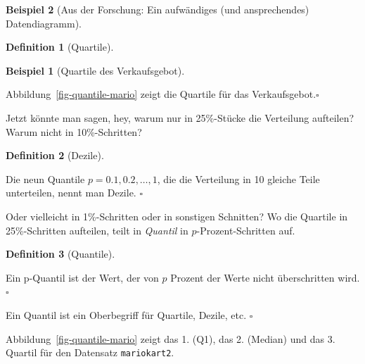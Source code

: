 \documentclass[
  a4paper,
]{scrbook}
\theoremstyle{definition}
\newtheorem{example}{Beispiel}[chapter]
\theoremstyle{definition}
\newtheorem{definition}{Definition}[chapter]
\theoremstyle{definition}
\theoremstyle{remark}
\begin{document}
\begin{example}[Aus der Forschung: Ein aufwändiges (und ansprechendes)
Datendiagramm]
\begin{definition}[Quartile]
\end{definition}

\begin{example}[Quartile des
Verkaufsgebot]\protect\hypertarget{exm-mario-qs}{}\label{exm-mario-qs}

Abbildung~\ref{fig-quantile-mario} zeigt die Quartile für das
Verkaufsgebot.\(\square\)

\end{example}

Jetzt könnte man sagen, hey, warum nur in 25\%-Stücke die Verteilung
aufteilen? Warum nicht in 10\%-Schritten?

\begin{definition}[Dezile]\protect\hypertarget{def-dezile}{}\label{def-dezile}

Die neun Quantile \(p= 0.1, 0.2, \ldots, 1\), die die Verteilung in 10
gleiche Teile unterteilen, nennt man Dezile. \(\square\)

\end{definition}

Oder vielleicht in 1\%-Schritten oder in sonstigen Schnitten? Wo die
Quartile in 25\%-Schritten aufteilen, teilt in \emph{Quantil} in
\(p\)-Prozent-Schritten auf.

\begin{definition}[Quantile]\protect\hypertarget{def-quantile}{}\label{def-quantile}

Ein p-Quantil ist der Wert, der von \(p\) Prozent der Werte nicht
überschritten wird.\(\square\)

\end{definition}

\begin{tcolorbox}[enhanced jigsaw, colbacktitle=quarto-callout-note-color!10!white, bottomrule=.15mm, left=2mm, breakable, rightrule=.15mm, coltitle=black, title=\textcolor{quarto-callout-note-color}{\faInfo}\hspace{0.5em}{Hinweis}, colback=white, leftrule=.75mm, titlerule=0mm, opacityback=0, bottomtitle=1mm, toprule=.15mm, arc=.35mm, toptitle=1mm, opacitybacktitle=0.6, colframe=quarto-callout-note-color-frame]

Ein Quantil ist ein Oberbegriff für Quartile, Dezile, etc. \(\square\)

\end{tcolorbox}

Abbildung~\ref{fig-quantile-mario} zeigt das 1. (Q1), das 2. (Median)
und das 3. Quartil für den Datensatz \texttt{mariokart2}.


\end{example}
\end{document}
